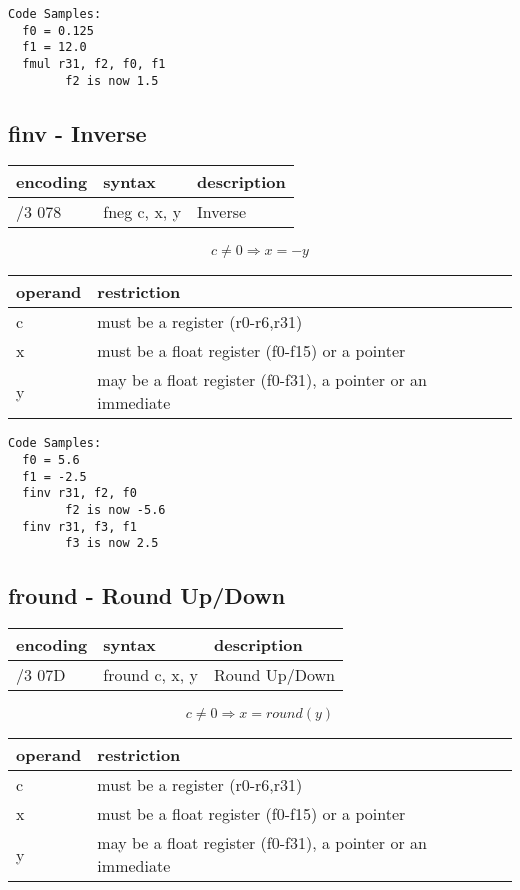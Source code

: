 \documentclass[letterpaper,10pt,openright,twoside,onecolumn]{book}
\begin{document}
  \begin{verbatim}
Code Samples:
  f0 = 0.125
  f1 = 12.0
  fmul r31, f2, f0, f1
        f2 is now 1.5
  \end{verbatim}
\newpage\subsection{finv - Inverse}
  \begin{tabular}{|l|l|l|}
   \hline
    encoding & syntax & description \\
   \hline
    /3 078 & fneg c, x, y & Inverse \\
   \hline
  \end{tabular}

  \begin{displaymath} c \neq 0 \Rightarrow x = -y\end{displaymath}

  \flushleft
  \begin{tabular}{|l|l|}
   \hline
    operand & restriction \\
   \hline
    c & must be a register (r0-r6,r31) \\
    x & must be a float register (f0-f15) or a pointer \\
    y & may be a float register (f0-f31), a pointer or an immediate \\
   \hline
  \end{tabular}

  \begin{verbatim}
Code Samples:
  f0 = 5.6
  f1 = -2.5
  finv r31, f2, f0
        f2 is now -5.6
  finv r31, f3, f1
        f3 is now 2.5
  \end{verbatim}
\newpage\subsection{fround - Round Up/Down}
  \begin{tabular}{|l|l|l|}
   \hline
    encoding & syntax & description \\
   \hline
    /3 07D & fround c, x, y & Round Up/Down \\
   \hline
  \end{tabular}

  \begin{displaymath} c \neq 0 \Rightarrow x = round(y)\end{displaymath}

  \flushleft
  \begin{tabular}{|l|l|}
   \hline
    operand & restriction \\
   \hline
    c & must be a register (r0-r6,r31) \\
    x & must be a float register (f0-f15) or a pointer \\
    y & may be a float register (f0-f31), a pointer or an immediate \\
   \hline
  \end{tabular}
\end{document}
